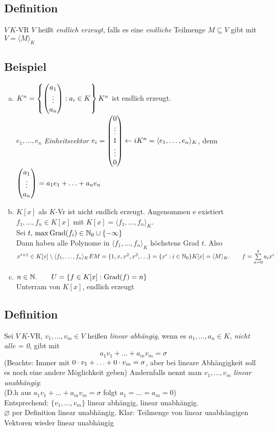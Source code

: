 \subsection{Definition}
$V\ K$-VR $V$ hei\ss t \emph{endlich erzeugt}, falls es eine \emph{endliche} Teilmenge $M \subseteq V$ gibt mit $V = \langle M \rangle _K$
\subsection{Beispiel}
\begin{enumerate}[a)]
\item $K^n = \left\{ \begin{pmatrix} a_1\\\vdots\\a_n \end{pmatrix} : a_i \in K\right\}\\
K^n$ ist endlich erzeugt.\\
$e_1,\ldots, e_n$ \emph{Einheitsvektor}
$e_i = \begin{pmatrix} 0\\\vdots\\1\\\vdots\\0 \end{pmatrix}\leftarrow i\\
K^n = \langle e_1,\ldots,e_n \rangle _K$, denn $\begin{pmatrix} a_1\\\vdots\\a_n \end{pmatrix} = a_1e_1 + \ldots + a_ne_n$
\item $K[x]$ als $K$-Vr ist nicht endlich erzeugt. Angenommen e existiert $f_1,\ldots,f_n \in K[x]$ mit $K[x] = \langle f_1,\ldots,f_n \rangle _K$.\\
Sei $t,\,\max \operatorname{Grad}(f_i) \in \mathbb{N}_0 \cup \{-\infty\}$\\
Dann haben alle Polynome in $\langle f_1,\ldots,f_n \rangle _K$ höchstens Grad $t$. Also $x^{t+1} \in K[x] \setminus \langle f_1,\ldots,f_n \rangle _K \Lightning\\
M = \{1,x,x^2,x^3,\ldots \} = \{ x^i: i \in \N_0 \}\\
K[x] = \langle M \rangle _K.\qquad f = \sum\limits_{n=0}^{t} a_i x^i$
\item $n \in \mathbb{N}. \qquad U = \{ f \in K[x]: \operatorname{Grad}(f) = n \}$\\
Unterram von $K[x]$, endlich erzeugt
\end{enumerate}
\subsection{Definition}
Sei $V\ K$-VR, $v_1,\ldots,v_m \in V$ hei\ss en \emph{linear abhängig}, wenn es $a_1,\ldots,a_n \in K$, \emph{nicht alle = 0}, gibt mit \[ a_1v_1 + \ldots + a_m v_m = \sigma \]
(Beachte: Immer mit $0\cdot v_1 + \ldots + 0 \cdot v_m = \sigma$,
aber bei lineare Abhängigkeit soll es noch eine andere Möglichkeit geben)
Andernfalls nennt man $v_1,\ldots,v_m$ \emph{linear unabhängig}:\\
(D.h aus $a_1v_1+\ldots+a_mv_m = \sigma$ folgt $a_1 = \ldots = a_m = 0$)\\
Entsprechend: $\{v_1,\ldots,v_m\}$ linear abhängig, linear unabhängig.\\
$\varnothing$ per Definition linear unabhängig.
Klar: Teilmenge von linear unabhängigen Vektoren wieder linear unabhängig
